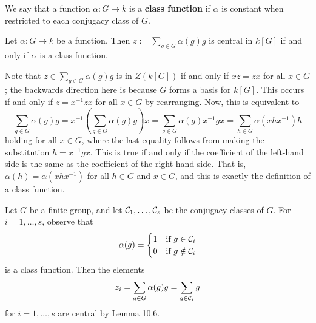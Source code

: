 \begin{defn}{}
    We say that a function $\alpha : G \to k$ is a {\bf class function} if 
    $\alpha$ is constant when restricted to each conjugacy class of $G$. 
\end{defn} 

\begin{lemma}{}
    Let $\alpha : G \to k$ be a function. Then $z := \sum_{g \in G} 
    \alpha(g) g$ is central in $k[G]$ if and only if $\alpha$ is a 
    class function. 
\end{lemma}
\begin{pf}
    Note that $z \in \sum_{g \in G} \alpha(g)g$ is in $Z(k[G])$ if and only if 
    $xz = zx$ for all $x \in G$; the backwards direction here is because $G$ 
    forms a basis for $k[G]$. This occurs if and only if 
    $z = x^{-1}zx$ for all $x \in G$ by rearranging. Now, this is 
    equivalent to 
    \[ \sum_{g \in G} \alpha(g)g = x^{-1} \left( \sum_{g \in G}
    \alpha(g)g \right) x = \sum_{g \in G} \alpha(g)x^{-1}gx
    = \sum_{h \in G} \alpha(xhx^{-1}) h \] 
    holding for all $x \in G$, where the last equality follows from 
    making the substitution $h = x^{-1}gx$. This is true if and only if 
    the coefficient of the left-hand side is the same as the 
    coefficient of the right-hand side. That is, $\alpha(h) = 
    \alpha(xhx^{-1})$ for all $h \in G$ and $x \in G$, and this is exactly 
    the definition of a class function. 
\end{pf}

Let $G$ be a finite group, and let ${\cal C}_1, 
\dots, {\cal C}_s$ be the conjugacy classes of $G$. For $i = 1, \dots, s$, 
observe that 
\[ \alpha(g) = \begin{cases} 1 & \text{if } g \in {\cal C}_i \\ 
    0 & \text{if } g \notin {\cal C}_i \end{cases} \]
is a class function. Then the elements 
\[ z_i = \sum_{g \in G} \alpha(g) g = \sum_{g \in {\cal C}_i} g \] 
for $i = 1, \dots, s$ are central by Lemma 10.6. 

